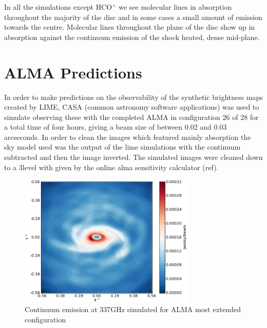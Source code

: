 \documentclass[useAMS,usenatbib]{mn2e}
\begin{document}
In all the simulations except HCO$^+$ we see molecular lines in absorption throughout the majority of the disc and in some cases a small amount of emission towards the centre. Molecular lines throughout the plane of the disc show up in absorption against the continuum emission of the shock heated, dense mid-plane. 





\section{ALMA Predictions} \label{sec:alma_predictions}

In order to make predictions on the observability of the synthetic brightness maps created by LIME, CASA (common astronomy software applications) was used to simulate observing these with the completed ALMA in configuration 26 of 28 for a total time of four hours, giving a beam size of between 0.02 and 0.03 arcseconds. In order to clean the images which featured mainly absorption the sky model used was the output of the lime simulations with the continuum subtracted and then the image inverted. The simulated images were cleaned down to a 3\sigma level with \sigma given by the online alma sensitivity calculator (ref).

\begin{figure}
 \includegraphics[width=84mm]{Figures/sim/casa_cont_337GHz.eps}

 \caption{Continuum emission at 337GHz simulated for ALMA most extended configuration}
\end{figure}

\end{document}
